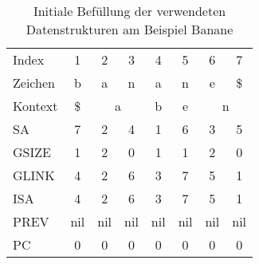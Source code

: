 \begin{table}[H]
\begin{tabular}{l|ccccccc}
Index   & 1                       & 2   & 3                      & 4                      & 5                      & 6          & 7         \\
Zeichen & b                       & a   & n                      & a                      & n                      & e          & \$        \\
Kontext & \multicolumn{1}{c|}{\$} & \multicolumn{2}{c|}{a}       & \multicolumn{1}{c|}{b} & \multicolumn{1}{c|}{e} & \multicolumn{2}{c}{n} \\
SA      & \multicolumn{1}{c|}{7}  & 2   & \multicolumn{1}{c|}{4} & \multicolumn{1}{c|}{1} & \multicolumn{1}{c|}{6} & 3          & 5         \\
GSIZE   & \multicolumn{1}{c|}{1}  & 2   & \multicolumn{1}{c|}{0} & \multicolumn{1}{c|}{1} & \multicolumn{1}{c|}{1} & 2          & 0         \\
GLINK   & 4                       & 2   & 6                      & 3                      & 7                      & 5          & 1         \\
ISA     & 4                       & 2   & 6                      & 3                      & 7                      & 5          & 1         \\
PREV    & nil                     & nil & nil                    & nil                    & nil                    & nil        & nil       \\
PC      & 0                       & 0   & 0                      & 0                      & 0                      & 0          & 0        
\end{tabular}

\caption[Initiale Bef{\"u}llung der verwendeten Datenstrukturen am Beispiel Banane]{Initiale Bef{\"u}llung der verwendeten Datenstrukturen am Beispiel Banane}
\label{fig_datastructures}
\end{table}